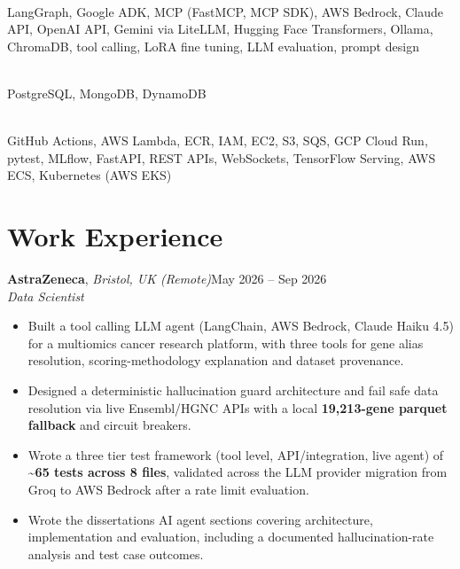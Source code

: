 \documentclass[a4paper,11pt]{article}
\newcommand{\sectionhead}[1]{\needspace{5\baselineskip}\section{#1}}
\newcommand{\entry}[3]{\needspace{4\baselineskip}\noindent #1\hfill #2\\ #3\par}
\begin{document}
\vspace{3pt}

    \\
    LangGraph, Google ADK, MCP (FastMCP, MCP SDK), AWS Bedrock, Claude API, OpenAI API, Gemini via LiteLLM, Hugging Face Transformers, Ollama, ChromaDB, tool calling, LoRA fine tuning, LLM evaluation, prompt design

\vspace{3pt}

    \\
    PostgreSQL, MongoDB, DynamoDB

\vspace{3pt}

    \\
    GitHub Actions, AWS Lambda, ECR, IAM, EC2, S3, SQS, GCP Cloud Run, pytest, MLflow, FastAPI, REST APIs, WebSockets, TensorFlow Serving, AWS ECS, Kubernetes (AWS EKS)

\sectionhead{Work Experience}
\vspace{2pt}

\entry{\textbf{AstraZeneca}, \textit{Bristol, UK (Remote)}}{May 2026 – Sep 2026}{\textit{Data Scientist}}
\begin{itemize}
    \item Built a tool calling LLM agent (LangChain, AWS Bedrock, Claude Haiku 4.5) for a multiomics cancer research platform, with three tools for gene alias resolution, scoring-methodology explanation and dataset provenance.
    \item Designed a deterministic hallucination guard architecture and fail safe data resolution via live Ensembl/HGNC APIs with a local \textbf{19,213-gene parquet fallback} and circuit breakers.
    \item Wrote a three tier test framework (tool level, API/integration, live agent) of \textbf{\textasciitilde{}65 tests across 8 files}, validated across the LLM provider migration from Groq to AWS Bedrock after a rate limit evaluation.
    \item Wrote the dissertation\textquotesingle{}s AI agent sections covering architecture, implementation and evaluation, including a documented hallucination-rate analysis and test case outcomes.
\end{itemize}

\vspace{6pt}
\end{document}
